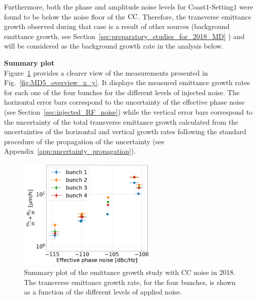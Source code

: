 
Furthermore, both the phase and amplitude noise levels for Coast$1$-Setting$1$ were found to be below the noise floor of the ${\mathrm{CC}}$. Therefore, the transverse emittance growth observed during that case is a result of other sources (background emittance growth, see Section~\ref{sec:preparatory_studies_for_2018_MD} ) and will be considered as the background growth rate in the analysis below. 

\textbf{Summary plot}\\
Figure~\ref{fig:MD5_summary_plot} provides a clearer view of the measurements presented in Fig.~\ref{fig:MD5_overview_x_y}. It displays the measured emittance growth rates for each one of the four bunches for the different levels of injected noise. The horizontal error bars correspond to the uncertainty of the effective phase noise (see Section~\ref{sec:injected_RF_noise}) while the vertical error bars correspond to the uncertainty of the total transverse emittance growth calculated from the uncertainties of the horizontal and vertical growth rates following the standard procedure of the propagation of the uncertainty (see Appendix~\ref{app:uncertainty_propagation}).

\begin{figure}[!h]
   \centering         
   \includegraphics[width=0.6\textwidth]{images/Ch5/MD5_summary_plot_no_backg_subtraction.png}
       \caption{Summary plot of the emittance growth study with CC noise in 2018. The transverse emittance growth rate, for the four bunches, is shown as a function of the different levels of applied noise.}
       \label{fig:MD5_summary_plot}
\end{figure}

